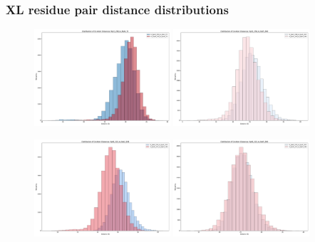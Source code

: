 \documentclass[a4paper,8pt]{beamer}
\begin{document}
%  
\begin{frame}
\frametitle{XL residue pair distance distributions}
\begin{figure}
\centering
\includegraphics[width=0.45\textwidth]{figures/Rpt2_258_to_Rpt4_72_distances_distribution.pdf}
\includegraphics[width=0.45\textwidth]{figures/Rpt2_258_to_Rpt5_300_distances_distribution.pdf}
\end{figure}
%
\begin{figure}
  \centering
  \includegraphics[width=0.45\textwidth]{figures/Rpt6_222_to_Rpt2_258_distances_distribution.pdf}
  \includegraphics[width=0.45\textwidth]{figures/Rpt6_222_to_Rpt5_300_distances_distribution.pdf}
  \end{figure}  
\end{frame}
%
%
\end{document}
